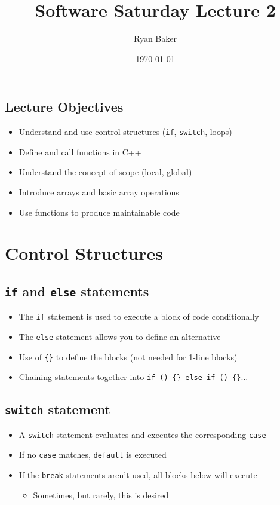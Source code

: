 \documentclass{article}
\title{Software Saturday Lecture 2}
\author{Ryan Baker}
\date{\today}
\begin{document}
\maketitle
\tableofcontents
\pagebreak

\subsection*{Lecture Objectives}

\begin{itemize}
	\item Understand and use control structures (\texttt{if}, \texttt{switch}, loops)
	\item Define and call functions in C++
	\item Understand the concept of scope (local, global)
	\item Introduce arrays and basic array operations
	\item Use functions to produce maintainable code
\end{itemize}

\section{Control Structures}

	\subsection{\texttt{if} and \texttt{else} statements } \begin{itemize}
		\item The \texttt{if} statement is used to execute a block of code conditionally
		\item The \texttt{else} statement allows you to define an alternative
		
		\item Use of \texttt{\{\}} to define the blocks (not needed  for 1-line blocks)
		\item Chaining statements together into \texttt{if () \{\} else if () \{\}}$\dots$
	\end{itemize}
	\subsection{\texttt{switch} statement} \begin{itemize}
		\item A \texttt{switch} statement evaluates and executes the corresponding \texttt{case}
		\item If no \texttt{case} matches, \texttt{default} is executed
		
		\item If the \texttt{break} statements aren't used, all blocks below will execute \begin{itemize}
			\item Sometimes, but rarely, this is desired
		\end{itemize}
	\end{itemize}
	
\end{document}
